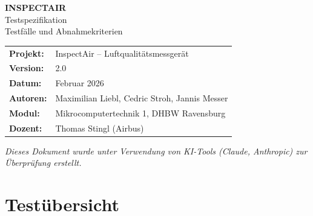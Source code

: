\documentclass[a4paper,11pt]{article}
\begin{document}
\begin{center}
{\LARGE\textbf{INSPECTAIR}}\\[0.3cm]
{\Large Testspezifikation}\\[0.3cm]
{\large Testfälle und Abnahmekriterien}\\[0.5cm]
\begin{tabular}{ll}
\textbf{Projekt:} & InspectAir -- Luftqualitätsmessgerät \\
\textbf{Version:} & 2.0 \\
\textbf{Datum:} & Februar 2026 \\
\textbf{Autoren:} & Maximilian Liebl, Cedric Stroh, Jannis Messer \\
\textbf{Modul:} & Mikrocomputertechnik 1, DHBW Ravensburg \\
\textbf{Dozent:} & Thomas Stingl (Airbus) \\
\end{tabular}
\end{center}

\vspace{0.5cm}
\noindent\textit{Dieses Dokument wurde unter Verwendung von KI-Tools (Claude, Anthropic) zur Überprüfung erstellt.}
\vspace{0.3cm}

\tableofcontents
\newpage

\section{Testübersicht}
\end{document}
